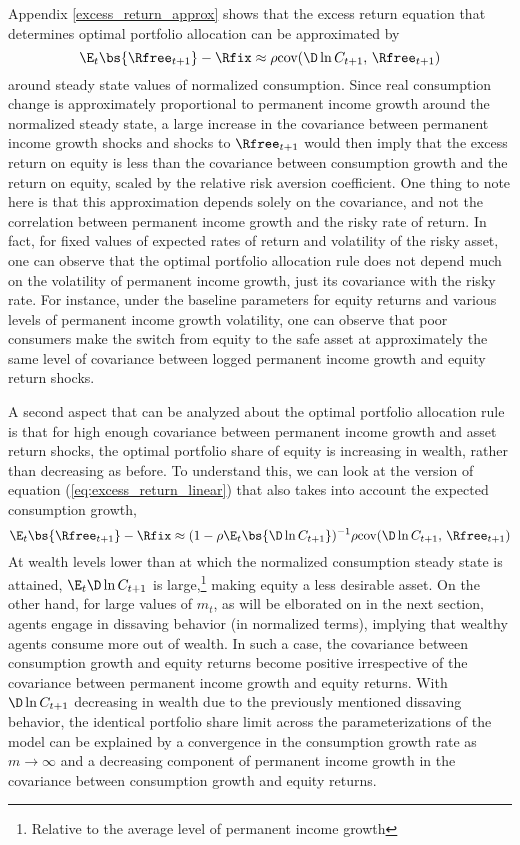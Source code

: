 Appendix \ref{excess_return_approx} shows that the excess return equation that determines optimal portfolio allocation can be approximated by
\begin{equation}\label{eq:excess_return_linear}
    \E_{t}\bs{\Rfree_{t+1}} - \Rfix \approx \rho\text{cov}(\D \ln C_{t+1},\,\Rfree_{t+1})
\end{equation}
around steady state values of normalized consumption. Since real consumption change is approximately proportional to permanent income growth around the normalized steady state, a large increase in the covariance between permanent income growth shocks and shocks to $\Rfree_{t+1}$ would then imply that the excess return on equity is less than the covariance between consumption growth and the return on equity, scaled by the relative risk aversion coefficient. One thing to note here is that this approximation depends solely on the covariance, and not the correlation between permanent income growth and the risky rate of return. In fact, for fixed values of expected rates of return and volatility of the risky asset, one can observe that the optimal portfolio allocation rule does not depend much on the volatility of permanent income growth, just its covariance with the risky rate. For instance, under the baseline parameters for equity returns and various levels of permanent income growth volatility, one can observe that poor consumers make the switch from equity to the safe asset at approximately the same level of covariance between logged permanent income growth and equity return shocks.

A second aspect that can be analyzed about the optimal portfolio allocation rule is that for high enough covariance between permanent income growth and asset return shocks, the optimal portfolio share of equity is increasing in wealth, rather than decreasing as before. To understand this, we can look at the version of equation (\ref{eq:excess_return_linear}) that also takes into account the expected consumption growth,
\[
    \E_{t}\bs{\Rfree_{t+1}} - \Rfix \approx (1-\rho\E_{t}\bs{\D\ln C_{t+1}})^{-1}\rho\text{cov}(\D \ln C_{t+1},\,\Rfree_{t+1})
\]
At wealth levels lower than at which the normalized consumption steady state is attained, $\E_{t}\D\ln C_{t+1}$ is large,\footnote{Relative to the average level of permanent income growth} making equity a less desirable asset. On the other hand, for large values of $m_{t}$, as will be elborated on in the next section, agents engage in dissaving behavior (in normalized terms), implying that wealthy agents consume more out of wealth. In such a case, the covariance between consumption growth and equity returns become positive irrespective of the covariance between permanent income growth and equity returns. With $\D\ln C_{t+1}$ decreasing in wealth due to the previously mentioned dissaving behavior, the identical portfolio share limit across the parameterizations of the model can be explained by a convergence in the consumption growth rate as $m \to \infty$ and a decreasing component of permanent income growth in the covariance between consumption growth and equity returns.

